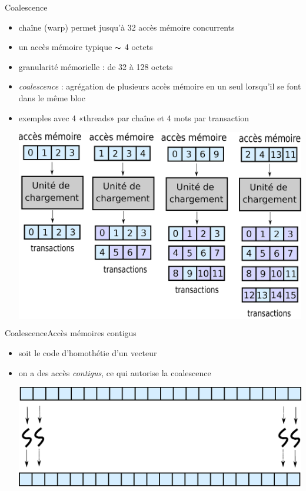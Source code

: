 \documentclass[11pt,mathserif]{beamer}
\newcommand{\argi}{\faLightbulbO}
\newcommand{\adibi}{\faCommentO}
\newcommand{\harritu}{\faExclamation}
\newcommand{\extcu}{cu}
\newcommand{\extcu}{cuf}
\newcommand{\includeSrcCu}[1]{}
\begin{document}
\begin{frame}{Coalescence}
  \begin{itemize}[<+->]
    \item[\argi] chaîne (warp) permet jusqu'à 32 accès mémoire concurrents
    \item[\argi] un accès mémoire typique $\thicksim$ 4 octets
    \item[\argi] granularité mémorielle : de 32 à 128 octets 
    \item[\harritu] {\em coalescence} : agrégation de plusieurs accès mémoire en un seul lorsqu'il se font dans le même bloc
    \item[\adibi] exemples avec 4 «threads» par chaîne et 4 mots par transaction
\begin{center}
  \colorbox{white}{\includegraphics[width=0.6\linewidth]{fig/coalescence.eps}}
\end{center}
  \end{itemize}
\end{frame}

\begin{frame}{Coalescence}{Accès mémoires contigus}
  \begin{itemize}[<+->]
    \item[\adibi] soit le code d'homothétie d'un vecteur
\begin{center}
\includeSrcCu{code/scale}
\end{center}
    \item[\argi] on a des accès {\em contigus}, ce qui autorise la coalescence
\begin{center}
  \vspace{0.5cm}
\includegraphics[width=0.8\linewidth]{fig/coalScale.eps}
\end{center}
  \end{itemize}
\end{frame}
\end{document}
